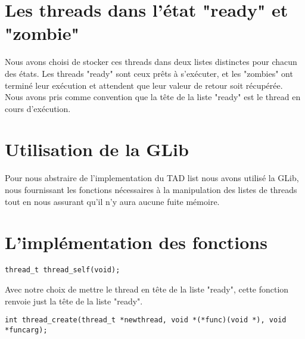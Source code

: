 \documentclass{article}
\begin{document}
\section {Les threads dans l'état "ready" et "zombie"}

Nous avons choisi de stocker ces threads dans deux listes distinctes
pour chacun des états. Les threads "ready" sont ceux prêts à
s'exécuter, et les "zombies" ont terminé leur exécution et attendent
que leur valeur de retour soit récupérée.\\
Nous avons pris comme convention que la tête de la liste "ready" est
le thread en cours d'exécution.

\section {Utilisation de la GLib}

Pour nous abstraire de l'implementation du TAD list nous avons utilisé
la GLib, nous fournissant les fonctions nécessaires à la manipulation
des listes de threads tout en nous assurant qu'il n'y aura aucune
fuite mémoire.

\section {L'implémentation des fonctions}

\begin{verbatim}
thread_t thread_self(void);
\end{verbatim}
Avec notre choix de mettre le thread en tête de la liste "ready", 
cette fonction renvoie just la tête de la liste "ready".
~~\\
\begin{verbatim}
int thread_create(thread_t *newthread, void *(*func)(void *), void *funcarg);
\end{verbatim}
\end{document}
